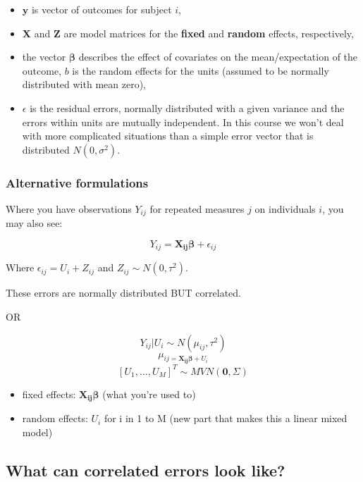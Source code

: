 \documentclass[
  openany]{book}
\providecommand{\tightlist}{%
  \setlength{\itemsep}{0pt}\setlength{\parskip}{0pt}}
\begin{document}
\begin{itemize}
\tightlist
\item
  \(\boldsymbol{y}\) is vector of outcomes for subject \(i\),
\item
  \(\boldsymbol{X}\) and \(\boldsymbol{Z}\) are model matrices for the \textbf{fixed} and \textbf{random} effects, respectively,
\item
  the vector \(\boldsymbol{\beta}\) describes the effect of covariates on the mean/expectation of the outcome, \(b\) is the random effects for the units (assumed to be normally distributed with mean zero),
\item
  \(\epsilon\) is the residual errors, normally distributed with a given variance and the errors within units are mutually independent. In this course we won't deal with more complicated situations than a simple error vector that is distributed \(N(0, \sigma^2)\).
\end{itemize}

\hypertarget{alternative-formulations}{%
\subsubsection{Alternative formulations}\label{alternative-formulations}}

Where you have observations \(Y_{ij}\) for repeated measures \(j\) on individuals \(i\), you may also see:

\[Y_{ij} = \boldsymbol{X_{ij}\beta} + \epsilon_{ij}\]

Where \(\epsilon_{ij} = U_i + Z_{ij}\) and \(Z_{ij} \sim N(0, \tau^2)\).

These errors are normally distributed BUT correlated.

OR

\[Y_{ij}|U_i \sim N(\mu_{ij}, \tau^2)\]
\[\mu_{ij{ = \boldsymbol{X_{ij}\beta}+U_i}}\]
\[ [U_1,\ldots,U_M]^T \sim MVN(\boldsymbol0, \Sigma)\]

\begin{itemize}
\tightlist
\item
  fixed effects: \(\boldsymbol{X_{ij}\beta}\) (what you're used to)
\item
  random effects: \(U_i\) for i in 1 to M (new part that makes this a linear mixed model)
\end{itemize}

\hypertarget{what-can-correlated-errors-look-like}{%
\subsection{What can correlated errors look like?}\label{what-can-correlated-errors-look-like}}
\end{document}
